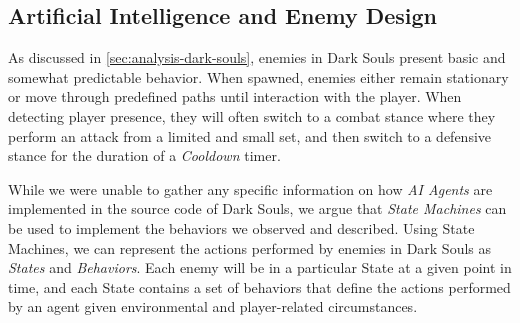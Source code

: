 




\subsection{Artificial Intelligence and Enemy Design}


As discussed in \ref{sec:analysis-dark-souls}, enemies in Dark Souls present basic and somewhat predictable behavior. When spawned, enemies either remain stationary or move through predefined paths until interaction with the player. When detecting player presence, they will often switch to a combat stance where they perform an attack from a limited and small set, and then switch to a defensive stance for the duration of a \emph{Cooldown} timer.

While we were unable to gather any specific information on how \emph{AI Agents} are implemented in the source code of Dark Souls, we argue that \emph{State Machines} can be used to implement the behaviors we observed and described. Using State Machines, we can represent the actions performed by enemies in Dark Souls as \emph{States} and \emph{Behaviors}. Each enemy will be in a particular State at a given point in time, and each State contains a set of behaviors that define the actions performed by an agent given environmental and player-related circumstances.

